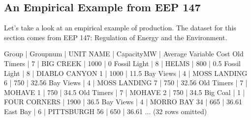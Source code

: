 \documentclass[letterpaper,10pt,english]{jupyterBook}
\begin{document}
\subsection{An Empirical Example from EEP 147}
\label{\detokenize{content/02-supply/02-eep147-example:an-empirical-example-from-eep-147}}\label{\detokenize{content/02-supply/02-eep147-example::doc}}
\sphinxAtStartPar
Let’s take a look at an empirical example of production. The dataset for this section comes from EEP 147: Regulation of Energy and the Environment.

\begin{sphinxVerbatim}[commandchars=\\\{\}]
  
        
    
\end{sphinxVerbatim}

\begin{sphinxVerbatim}[commandchars=\\\{\}]
Group        | Group\PYGZus{}num | UNIT NAME       | Capacity\PYGZus{}MW | Average Variable Cost
Old Timers   | 7         | BIG CREEK       | 1000        | 0
Fossil Light | 8         | HELMS           | 800         | 0.5
Fossil Light | 8         | DIABLO CANYON 1 | 1000        | 11.5
Bay Views    | 4         | MOSS LANDING 6  | 750         | 32.56
Bay Views    | 4         | MOSS LANDING 7  | 750         | 32.56
Old Timers   | 7         | MOHAVE 1        | 750         | 34.5
Old Timers   | 7         | MOHAVE 2        | 750         | 34.5
Big Coal     | 1         | FOUR CORNERS    | 1900        | 36.5
Bay Views    | 4         | MORRO BAY 3\PYGZam{}4   | 665         | 36.61
East Bay     | 6         | PITTSBURGH 5\PYGZam{}6  | 650         | 36.61
... (32 rows omitted)
\end{sphinxVerbatim}
\end{document}
